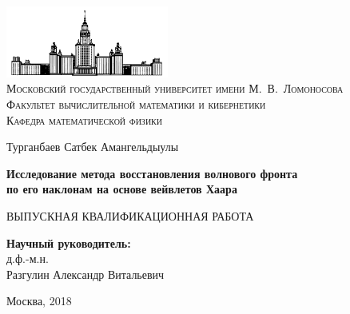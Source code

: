 \documentclass{article}
\begin{document}
\titlepage 


	\thispagestyle{empty}
	
	\begin{center}
		\ \vspace{-1cm}
		
		\includegraphics[width=0.4\textwidth]{msu_logo_small.png}\\
		\textsc { Московский государственный университет имени М.~В.~Ломоносова\\
		Факультет вычислительной математики и кибернетики\\
		Кафедра математической физики}
		
		\vfill
		
		\Large{ Турганбаев Сатбек Амангельдыулы}
		
		\vspace{1cm}
		
	       \LARGE \textbf {Исследование метода восстановления волнового фронта\\ по его наклонам на основе вейвлетов Хаара }


		\vspace{1cm}

		\large  {ВЫПУСКНАЯ КВАЛИФИКАЦИОННАЯ РАБОТА }
	\end{center}
	
	\vspace{1cm}
	
	\begin{flushright}
		\large{
		\textbf{Научный руководитель:}\\
		д.ф.-м.н.\\
                Разгулин Александр Витальевич
               }
	\end{flushright}
	
	\vfill
	
	\begin{center}
		\large{Москва, 2018}
	\end{center}





\newpage

\tableofcontents



\end{document}
